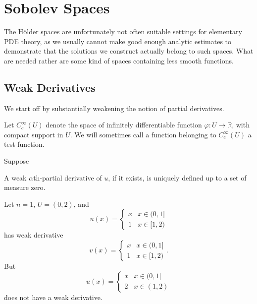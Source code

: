 \section{Sobolev Spaces}
The H\"older spaces are unfortunately not often suitable settings for elementary PDE theory,
as we usually cannot make good enough analytic estimates to demonstrate that the solutions we construct actually belong to such spaces.
What are needed rather are some kind of spaces containing less smooth functions.

\subsection{Weak Derivatives}
We start off by substantially weakening the notion of partial derivatives.
\begin{notation}
Let $C_c^\infty(U)$ denote the space of infinitely differentiable function $\varphi:U\to\mathbb{R}$, with compact support in $U$.
We will sometimes call a function belonging to $C_c^\infty(U)$ a test function.
\end{notation}

\begin{definition}
    Suppose 
\end{definition}

\begin{lemma}
    A weak $\alpha$th-partial derivative of $u$, if it exists, is uniquely defined up to a set of measure zero.
\end{lemma}

\begin{example}
    Let $n=1$, $U=(0,2)$, and 
    \[ u(x)=\left\{\begin{matrix}
        x  & x\in(0,1]\\
        1  & x\in[1,2)
        \end{matrix}\right.\] 
    has weak derivative 
        \[
            v(x)=\left\{\begin{matrix}
            x  & x\in(0,1]\\
            1  & x\in[1,2)
            \end{matrix}\right..\] 
    But \[ u(x)=\left\{\begin{matrix}
        x  & x\in(0,1]\\
        2  & x\in(1,2)
        \end{matrix}\right.\] 
    does not have a weak derivative.
        
\end{example}

